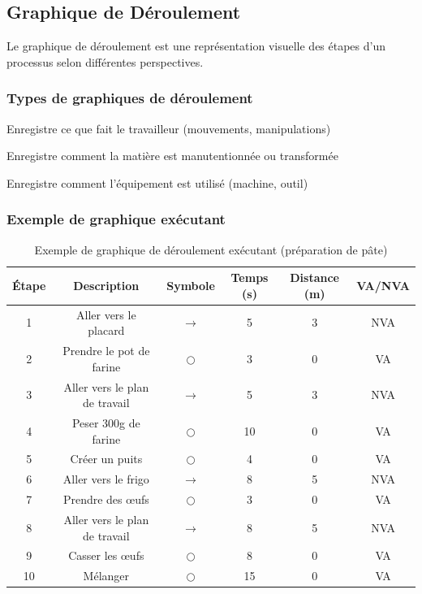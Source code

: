 \documentclass[a4paper,12pt]{article}
\begin{document}
\subsection{Graphique de Déroulement}

Le graphique de déroulement est une représentation visuelle des étapes d'un processus selon différentes perspectives.

\subsubsection{Types de graphiques de déroulement}

\begin{description}[labelwidth=4.5cm]
    \item[Graphique exécutant] Enregistre ce que fait le travailleur (mouvements, manipulations)
    \item[Graphique matière] Enregistre comment la matière est manutentionnée ou transformée
    \item[Graphique matériel] Enregistre comment l'équipement est utilisé (machine, outil)
\end{description}

\subsubsection{Exemple de graphique exécutant}

\begin{table}[ht]
\centering
\begin{tabular}{|c|c|c|c|c|c|}
\hline
\textbf{Étape} & \textbf{Description} & \textbf{Symbole} & \textbf{Temps (s)} & \textbf{Distance (m)} & \textbf{VA/NVA} \\
\hline
1 & Aller vers le placard & $\rightarrow$ & 5 & 3 & NVA \\
2 & Prendre le pot de farine & $\bigcirc$ & 3 & 0 & VA \\
3 & Aller vers le plan de travail & $\rightarrow$ & 5 & 3 & NVA \\
4 & Peser 300g de farine & $\bigcirc$ & 10 & 0 & VA \\
5 & Créer un puits & $\bigcirc$ & 4 & 0 & VA \\
6 & Aller vers le frigo & $\rightarrow$ & 8 & 5 & NVA \\
7 & Prendre des œufs & $\bigcirc$ & 3 & 0 & VA \\
8 & Aller vers le plan de travail & $\rightarrow$ & 8 & 5 & NVA \\
9 & Casser les œufs & $\bigcirc$ & 8 & 0 & VA \\
10 & Mélanger & $\bigcirc$ & 15 & 0 & VA \\
\hline
\end{tabular}
\caption{Exemple de graphique de déroulement exécutant (préparation de pâte)}
\end{table}
\end{document}
